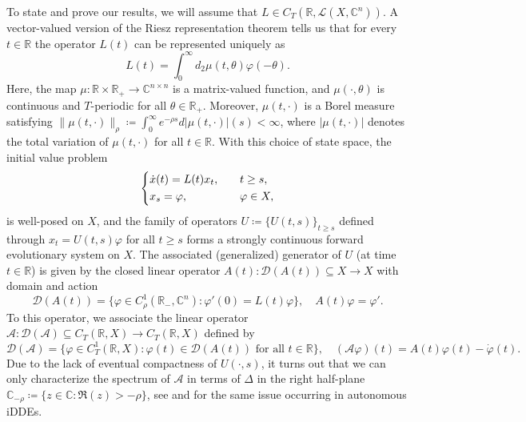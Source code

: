 \documentclass[english]{myarticle}
\begin{document}
\begin{sloppypar}
To state and prove our results, we will assume that $L \in C_T(\mathbb{R},\mathcal{L}(X,\mathbb{C}^n))$. A vector-valued version of the Riesz representation theorem tells us that for every $t \in \mathbb{R}$ the operator $L(t)$ can be represented uniquely as
\begin{equation*}
    L(t) = \int_0^\infty d_2 \mu(t,\theta) \varphi(-\theta).
\end{equation*}
Here, the map $\mu : \mathbb{R} \times \mathbb{R}_{+} \to \mathbb{C}^{n \times n}$ is a matrix-valued function, and $\mu(\cdot,\theta)$ is continuous and $T$-periodic for all $\theta \in \mathbb{R}_{+}$. Moreover, $\mu(t,\cdot)$ is a Borel measure satisfying $\|\mu(t,\cdot)\|_\rho \coloneqq \int_0^\infty e^{-\rho s} d |\mu(t,\cdot)|(s) < \infty$, where $|\mu(t,\cdot)|$ denotes the total variation of $\mu(t,\cdot)$ for all $t \in \mathbb{R}$. With this choice of state space, the initial value problem
\begin{equation} \label{eq:LinearDDEinfinite}
    \begin{dcases}
    \dot{x}(t) = L(t)x_t, \quad &t \geq s, \\
    x_s = \varphi, \quad &\varphi \in X,    
    \end{dcases}    
\end{equation}
is well-posed on $X$, and the family of operators $U \coloneqq \{U(t,s)\}_{t \geq s}$ defined through $x_t = U(t, s)\varphi$ for all $t \geq s$ forms a strongly continuous forward evolutionary system on $X$. The associated (generalized) generator of $U$ (at time $t \in \mathbb{R}$) is given by the closed linear operator $A(t) : \mathcal{D}(A(t)) \subseteq X \to X$ with domain and action
\begin{equation*}
    \mathcal{D}(A(t)) = \{ \varphi \in C_\rho^1(\mathbb{R}_{-},\mathbb{C}^n) : \varphi'(0) = L(t)\varphi \}, \quad A(t)\varphi = \varphi'.
\end{equation*}
To this operator, we associate the linear operator $\mathcal{A} : \mathcal{D}(\mathcal{A}) \subseteq C_T(\mathbb{R},X) \to C_T(\mathbb{R},X)$ defined by 
\begin{equation} \label{eq:curlya_idde}
     \mathcal{D}(\mathcal{A}) = \{ \varphi \in C_T^1(\mathbb{R},X) : \varphi(t) \in \mathcal{D}(A(t)) \mbox{ for all $t \in \mathbb{R}$} \}, \quad (\mathcal{A}\varphi)(t) = A(t)\varphi(t) - \dot{\varphi}(t). 
\end{equation}
Due to the lack of eventual compactness of $U(\cdot,s)$, it turns out that we can only characterize the spectrum of $\mathcal{A}$ in terms of $\Delta$ in the right half-plane $\mathbb{C}_{-\rho} \coloneqq \{ z \in \mathbb{C} : \Re(z) > -\rho \}$,
see \cite[Section II.1.3]{Kaashoek1992} and \cite[Section 4]{Diekmann2012} for the same issue occurring in autonomous iDDEs. 


\end{sloppypar}
\end{document}
